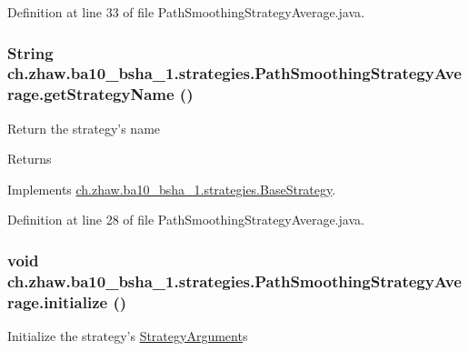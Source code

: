 Definition at line 33 of file PathSmoothingStrategyAverage.java.\hypertarget{classch_1_1zhaw_1_1ba10__bsha__1_1_1strategies_1_1PathSmoothingStrategyAverage_a3f53ea1550d9fd947e54fab6150b6ed9}{
\subsubsection[{getStrategyName}]{\setlength{\rightskip}{0pt plus 5cm}String ch.zhaw.ba10\_\-bsha\_\-1.strategies.PathSmoothingStrategyAverage.getStrategyName ()}}
\label{classch_1_1zhaw_1_1ba10__bsha__1_1_1strategies_1_1PathSmoothingStrategyAverage_a3f53ea1550d9fd947e54fab6150b6ed9}
Return the strategy's name

\begin{DoxyReturn}{Returns}

\end{DoxyReturn}


Implements \hyperlink{classch_1_1zhaw_1_1ba10__bsha__1_1_1strategies_1_1BaseStrategy_aa0ebed55eed45409bad13d43a0058780}{ch.zhaw.ba10\_\-bsha\_\-1.strategies.BaseStrategy}.

Definition at line 28 of file PathSmoothingStrategyAverage.java.\hypertarget{classch_1_1zhaw_1_1ba10__bsha__1_1_1strategies_1_1PathSmoothingStrategyAverage_a099125627db9d618ec732fe47250f7f5}{
\subsubsection[{initialize}]{\setlength{\rightskip}{0pt plus 5cm}void ch.zhaw.ba10\_\-bsha\_\-1.strategies.PathSmoothingStrategyAverage.initialize ()}}
\label{classch_1_1zhaw_1_1ba10__bsha__1_1_1strategies_1_1PathSmoothingStrategyAverage_a099125627db9d618ec732fe47250f7f5}
Initialize the strategy's \hyperlink{classch_1_1zhaw_1_1ba10__bsha__1_1_1StrategyArgument}{StrategyArgument}s 

